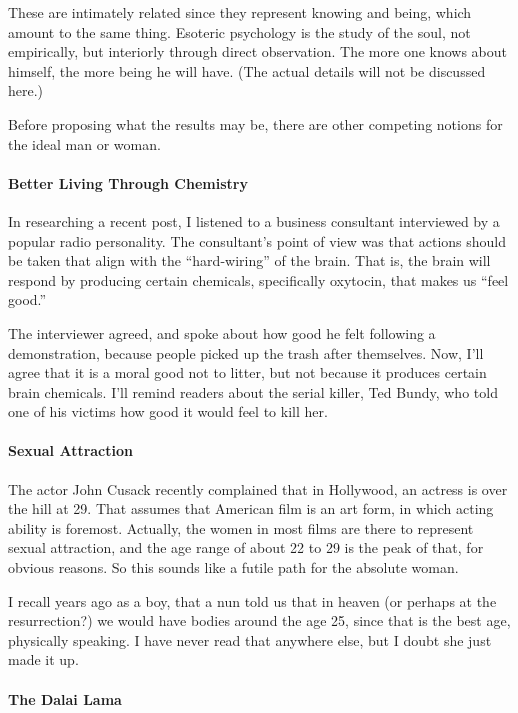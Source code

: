 These are intimately related since they represent knowing and being, which amount to the same thing. Esoteric psychology is the study of the soul, not empirically, but interiorly through direct observation. The more one knows about himself, the more being he will have. (The actual details will not be discussed here.)

Before proposing what the results may be, there are other competing notions for the ideal man or woman.

\paragraph{Better Living Through Chemistry}


In researching a recent post, I listened to a business consultant interviewed by a popular radio personality. The consultant's point of view was that actions should be taken that align with the ``hard-wiring'' of the brain. That is, the brain will respond by producing certain chemicals, specifically oxytocin, that makes us ``feel good.''

The interviewer agreed, and spoke about how good he felt following a demonstration, because people picked up the trash after themselves. Now, I'll agree that it is a moral good not to litter, but not because it produces certain brain chemicals. I'll remind readers about the serial killer, Ted Bundy, who told one of his victims how good it would feel to kill her.

\paragraph{Sexual Attraction}


The actor John Cusack recently complained that in Hollywood, an actress is over the hill at 29. That assumes that American film is an art form, in which acting ability is foremost. Actually, the women in most films are there to represent sexual attraction, and the age range of about 22 to 29 is the peak of that, for obvious reasons. So this sounds like a futile path for the absolute woman.

I recall years ago as a boy, that a nun told us that in heaven (or perhaps at the resurrection?) we would have bodies around the age 25, since that is the best age, physically speaking. I have never read that anywhere else, but I doubt she just made it up.

\paragraph{The Dalai Lama}


